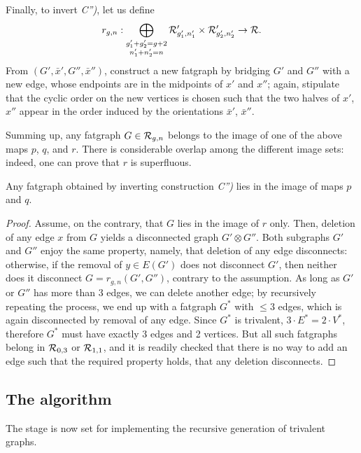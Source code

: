 Finally, to invert {\slshape C'')}, let us define
\begin{equation*}
r_{g,n}: \bigoplus_{\substack{g'_1+g'_2=g+2 \\ n'_1+n'_2=n}} 
\mathcal{R}'_{g'_1, n'_1} \times \mathcal{R}'_{g'_2, n'_2} \to \mathcal{R}.
\end{equation*}
From $(G', \bar{x}', G'',
\bar{x}'')$, construct a new fatgraph by bridging $G'$ and $G''$ with
a new edge, whose endpoints are in the midpoints of $x'$ and $x''$;
again, stipulate that the cyclic order on the new vertices is chosen
such that the two halves of $x'$, $x''$ appear in the order induced by
the orientations $\bar{x}'$, $\bar{x}''$.

Summing up, any fatgraph $G \in \mathcal{R}_{g,n}$ belongs to the image of one
of the above maps $p$, $q$, and $r$. There is considerable
overlap among the different image sets: indeed, one can prove that
$r$ is superfluous.
\begin{lemma}\label{lemma:no-c2}
  Any fatgraph obtained by inverting construction {\slshape C'')} lies in
  the image of maps $p$ and $q$.
\end{lemma}
\begin{proof}
  Assume, on the contrary, that $G$ lies in the image of $r$ only.
  Then, deletion of any edge $x$ from $G$ yields a disconnected graph
  $G' \otimes G''$.  Both subgraphs $G'$ and $G''$ enjoy the same
  property, namely, that deletion of any edge disconnects: otherwise,
  if the removal of $y \in E(G')$ does not disconnect $G'$, then
  neither does it disconnect $G = r_{g,n}(G', G'')$, contrary to the
  assumption. As long as $G'$ or $G''$ has more than 3 edges, we can
  delete another edge; by recursively repeating the process, we end up
  with a fatgraph $G^*$ with $\leq 3$ edges, which is again
  disconnected by removal of any edge.  Since $G^*$ is trivalent, $3
  \cdot E^* = 2 \cdot V^*$, therefore $G^*$ must have exactly 3 edges
  and 2 vertices. But all such fatgraphs belong in $\mathcal{R}_{0,3}$ or
  $\mathcal{R}_{1,1}$, and it is readily checked that there is no way to add an
  edge such that the required property holds, that any deletion
  disconnects.
\end{proof}

\subsection{The  algorithm}
\label{sec:MgnTrivalentGraphs}

The stage is now set for implementing the recursive generation of
trivalent graphs.

